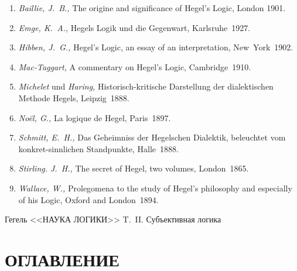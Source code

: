 \begin{enumerate}
\item{\em Baillie, J.~B.,} The origine and signi\-ficance of Hegel's Logic,
London 1901.
\item{\em Emge, K.~A.,} Hegels Logik und die Gegenwart, Karlsruhe~1927.
\item{\em Hibben, J.~G.,} Hegel's Logic, an essay of an interpre\-tation,
New~York~1902.
\item{\em Mac-Taggart,} A commentary on Hegel's Logic, Cambridge~1910.
\item{\em Michelet} und {\em Haring,} Historisch-kritische Darstellung
der dialekti\-schen Methode Hegels, Leipzig~1888.
\item{\em Noël, G.,} La logique de Hegel, Paris~1897.
\item{\em Schmitt, E.~H.,} Das Geheimniss der Hegelschen Dialektik, beleuchtet
vom konkret-sinnlichen Stand\-punkte, Halle~1888.
\item{\em Stirling. J.~H.,} The secret of Hegel, two volumes, London~1865.
\item{\em Wallace, W.,} Prolegomena to the study of Hegel's philosophy and
especially of his Logic, Oxford and London~1894.
\end{enumerate}

\clearpage
\bigskip
\printpagenotes
\bigskip
\bigskip

{\centering Гегель <<НАУКА ЛОГИКИ>> T.~II. Субъективная логика \par}

\renewcommand\contentsname{}
\section*[Оглавление]{ОГЛАВЛЕНИЕ}
\tableofcontents

\bigskip
\clearpage
\bigskip

